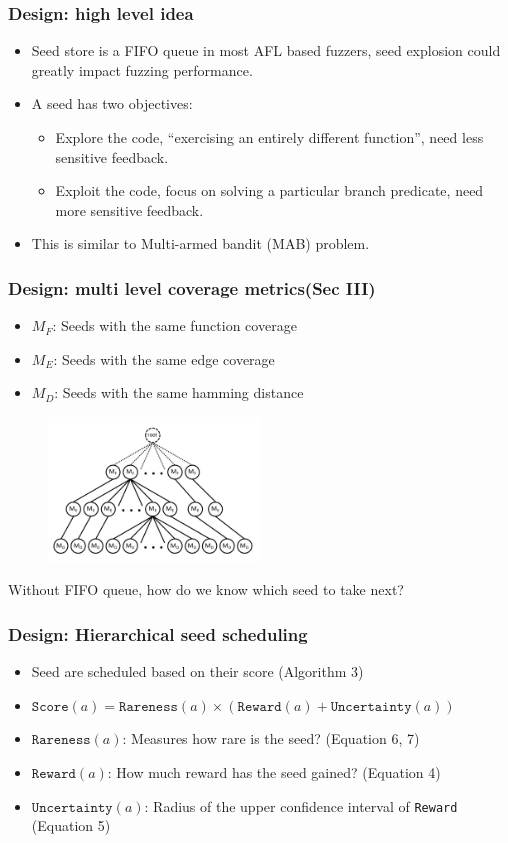 \begin{frame}
	\frametitle{Design: high level idea}
	\begin{itemize}
		\item Seed store is a FIFO queue in most AFL based fuzzers, seed explosion could greatly impact fuzzing performance.
		\item A seed has two objectives:
		      \begin{itemize}
			      \item Explore the code, ``exercising an entirely different function'', need less sensitive feedback.
			      \item Exploit the code, focus on solving a particular branch predicate, need more sensitive feedback.
		      \end{itemize}
		\item This is similar to Multi-armed bandit (MAB) problem.
	\end{itemize}
\end{frame}

\begin{frame}
	\frametitle{Design: multi level coverage metrics(Sec III)}
	\begin{itemize}
		\item $M_F$: Seeds with the same function coverage
		\item $M_E$: Seeds with the same edge coverage
		\item $M_D$: Seeds with the same hamming distance
	\end{itemize}

	\begin{figure}
		\centering
		\includegraphics[width=0.5\textwidth]{figs/seedtree.png}
	\end{figure}

	Without FIFO queue, how do we know which seed to take next?
\end{frame}

\begin{frame}
	\frametitle{Design: Hierarchical seed scheduling}
	\begin{itemize}
		\item Seed are scheduled based on their score (Algorithm 3)
		\item $\texttt{Score}(a) = \texttt{Rareness}(a) \times (\texttt{Reward}(a) + \texttt{Uncertainty}(a))$
		\item $\texttt{Rareness}(a)$: Measures how rare is the seed? (Equation 6, 7)
		\item $\texttt{Reward}(a)$: How much reward has the seed gained? (Equation 4)
		\item $\texttt{Uncertainty}(a)$: Radius of the upper confidence interval of \texttt{Reward} (Equation 5)
	\end{itemize}
\end{frame}